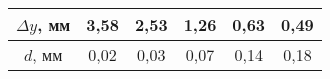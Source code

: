 \begin{table}[]
    \centering
    \begin{tabular}{|c|c|c|c|c|c|}
    \hline
    $\Delta y$, мм & 3,58 & 2,53 & 1,26 & 0,63 & 0,49 \\ \hline
    $d$, мм        & 0,02 & 0,03 & 0,07 & 0,14 & 0,18 \\ \hline
    \end{tabular}
\end{table}